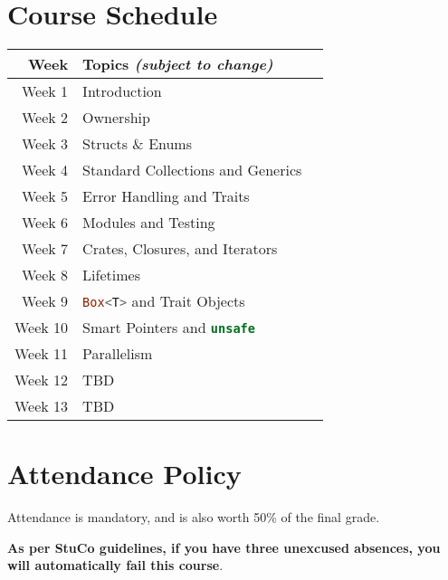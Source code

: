 \documentclass{article}
\newcommand{\code}[2][]{{\sloppy
\ifmmode
\text{\lstinline[language=rust,#1]`#2`}
\else
{\lstinline[language=rust,#1]`#2`}%
\fi}}
\begin{document}

\clearpage


\section*{Course Schedule}

\begin{longtable}{rp{}@{\hskip .075\textwidth}p{}}
    Week        & Topics \textit{(subject to change)}     \\
    \toprule
    Week 1      & Introduction \\
    Week 2      & Ownership \\
    Week 3      & Structs \& Enums \\
    Week 4      & Standard Collections and Generics \\
    Week 5      & Error Handling and Traits \\
    Week 6      & Modules and Testing \\
    Week 7      & Crates, Closures, and Iterators \\
    Week 8      & Lifetimes \\
    Week 9      & \code{Box<T>} and Trait Objects \\
    Week 10     & Smart Pointers and \code{unsafe} \\
    Week 11     & Parallelism \\
    Week 12     & TBD \\
    Week 13     & TBD \\
    \bottomrule
\end{longtable}


\section*{Attendance Policy}

Attendance is mandatory, and is also worth 50\% of the final grade.

\textbf{As per StuCo guidelines, if you have three unexcused absences, you will
automatically fail this course}.

\end{document}
